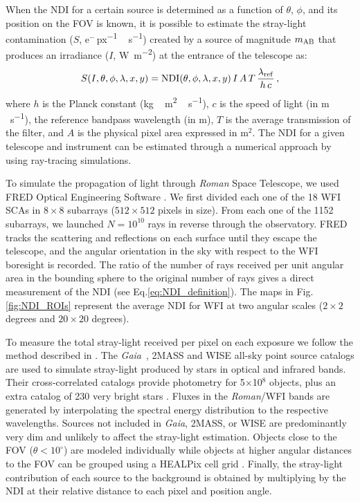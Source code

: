 \documentclass{iau}
\newcommand{\Gaia}{\emph{Gaia}}
\begin{document}
When the NDI for a certain source is determined as a function of $\theta$, $\phi$, and its position on the FOV is known, it is possible to estimate the stray-light contamination ($S$, e$^-$\,\si{{\rm px}^{-1}\,{\rm s}^{-1}}) created by a source of magnitude $m_{\rm AB}$ that produces an irradiance ($I$, \si{W m^{-2}}) at the entrance of the telescope as:
%
\begin{equation}
\label{eq:straylight_estimation_3}
S(I,\theta,\phi,\lambda,x,y) = {\rm NDI}(\theta,\phi,\lambda,x,y)\,I\,A\,T\, \frac{\lambda_{\rm ref}}{h\,c} \,,
\end{equation}
where $h$ is the Planck constant (\si{kg\,m^2\, s^{-1}}), $c$ is the speed of light (in \si{m\, s^{-1}}), the reference bandpass wavelength (in \si{m}), $T$ is the average transmission of the filter, and $A$ is the physical pixel area expressed in m$^2$. The NDI for a given telescope and instrument can be estimated through a numerical approach by using ray-tracing simulations. 


To simulate the propagation of light through \emph{Roman} Space Telescope, we used FRED Optical Engineering Software \citep[i.e., \texttt{FRED} hereafter,][]{turner2004inproceedings_333}. We first divided each one of the 18 WFI SCAs in $8\times8$ subarrays ($512\times512$ pixels in size). From each one of the 1152 subarrays, we launched $N=10^{10}$ rays in reverse through the observatory. FRED tracks the scattering and reflections on each surface until they escape the telescope, and the angular orientation in the sky with respect to the WFI boresight is recorded. The ratio of the number of rays received per unit angular area in the bounding sphere to the original number of rays gives a direct measurement of the NDI (see Eq.\ref{eq:NDI_definition}). The maps in Fig.\,\ref{fig:NDI_ROIs} represent the average NDI for WFI at two angular scales ($2\times2$ degrees and $20\times20$ degrees).

To measure the total stray-light received per pixel on each exposure we follow the method described in \citet[][]{Borlaff+2022aap657_92}. The \Gaia\ \citep[0.3 -- 1 $\mu$m][]{collaboration+2018aap616_1}, 2MASS \citep[1.2 -- 2.2 $\mu$m,][]{skrutskie+2006aj131_1163} and WISE all-sky \citep[3.4 -- 22 $\mu$m,][]{Wright2010AJ....140.1868W} point source catalogs are used to simulate stray-light produced by stars in optical and infrared bands. Their cross-correlated catalogs provide photometry for 5$\times$10$^8$ objects, plus an extra catalog of 230 very bright stars \citep[not directly observable with \emph{Gaia};][]{sahlmann+2016inproceedings_99042E}. Fluxes in the \emph{Roman}/WFI bands are generated by interpolating the spectral energy distribution to the respective wavelengths. Sources not included in \Gaia, 2MASS, or WISE are predominantly very dim and unlikely to affect the stray-light estimation. Objects close to the FOV ($\theta<10^{\circ}$) are modeled individually while objects at higher angular distances to the FOV can be grouped using a HEALPix cell grid \citep{gorski+2005apj622_759}. Finally, the stray-light contribution of each source to the background is obtained by multiplying by the NDI at their relative distance to each pixel and position angle.
\end{document}
